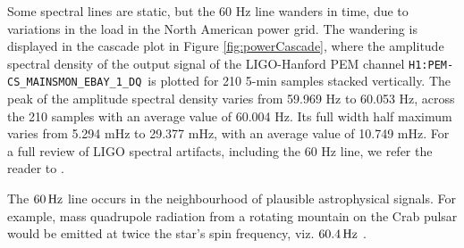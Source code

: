 \documentclass[pra,superscriptaddress,reprint,amsmath,amssymb,nofootinbib]{revtex4-2}
\newcommand{\CSOneName}{\texttt{H1:PEM-CS\_MAINSMON\_EBAY\_1\_DQ}}
\begin{document}
Some spectral lines are static, but the 60 Hz line wanders in time, due to variations in the load in the North American power grid. The wandering is displayed in the cascade plot in Figure \ref{fig:powerCascade}, where the amplitude spectral density of the output signal of the LIGO-Hanford PEM channel \CSOneName \, is plotted for 210 5-min samples stacked vertically. The peak of the amplitude spectral density varies from 59.969 Hz  to 60.053 Hz, across the 210 samples with an average value of 60.004 Hz. Its full width half maximum varies from 5.294 mHz to 29.377 mHz, with an average value of 10.749  mHz. For a full review of LIGO spectral artifacts, including the 60 Hz line, we refer the reader to \cite{CovasEtAl:2018}. \newline 


The $60 \, {\rm Hz}$ line occurs in the neighbourhood of plausible astrophysical signals. For example, mass quadrupole radiation from a rotating mountain on the Crab pulsar would be emitted at twice the star's spin frequency, viz. $60.4 \, {\rm Hz}$ \citep{Riles2023,Wette2023}.
\end{document}
